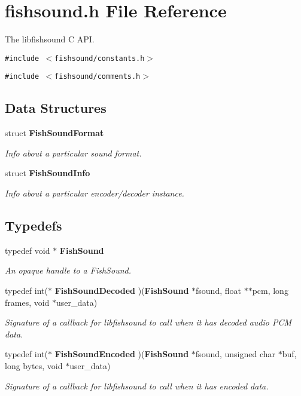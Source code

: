 \section{fishsound.h File Reference}
\label{fishsound_8h}
The libfishsound C API.  


{\tt \#include $<$fishsound/constants.h$>$}\par
{\tt \#include $<$fishsound/comments.h$>$}\par
\subsection*{Data Structures}
\begin{CompactItemize}
\item 
struct {\bf Fish\-Sound\-Format}
\begin{CompactList}\small\item\em Info about a particular sound format. \item\end{CompactList}\item 
struct {\bf Fish\-Sound\-Info}
\begin{CompactList}\small\item\em Info about a particular encoder/decoder instance. \item\end{CompactList}\end{CompactItemize}
\subsection*{Typedefs}
\begin{CompactItemize}
\item 
typedef void $\ast$ {\bf Fish\-Sound}
\begin{CompactList}\small\item\em An opaque handle to a Fish\-Sound. \item\end{CompactList}\item 
typedef int($\ast$ {\bf Fish\-Sound\-Decoded} )({\bf Fish\-Sound} $\ast$fsound, float $\ast$$\ast$pcm, long frames, void $\ast$user\_\-data)
\begin{CompactList}\small\item\em Signature of a callback for libfishsound to call when it has decoded audio PCM data. \item\end{CompactList}\item 
typedef int($\ast$ {\bf Fish\-Sound\-Encoded} )({\bf Fish\-Sound} $\ast$fsound, unsigned char $\ast$buf, long bytes, void $\ast$user\_\-data)
\begin{CompactList}\small\item\em Signature of a callback for libfishsound to call when it has encoded data. \item\end{CompactList}\end{CompactItemize}
